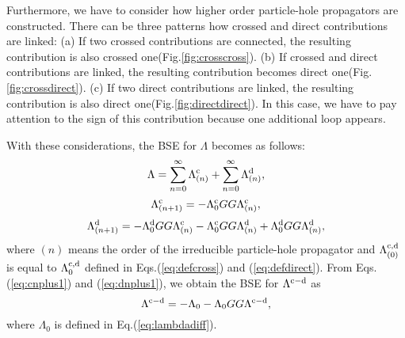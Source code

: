 %
Furthermore, we have to consider how higher order particle-hole propagators are constructed.
There can be three patterns how crossed and direct contributions are linked:
(a) If two crossed contributions are connected, the resulting contribution is also crossed one(Fig.\ref{fig:crosscross}).
(b) If crossed and direct contributions are linked, the resulting contribution becomes direct one(Fig.\ref{fig:crossdirect}).
(c) If two direct contributions are linked, the resulting contribution is also direct one(Fig.\ref{fig:directdirect}). 
In this case, we have to pay attention to the sign of this contribution because one additional loop appears.

With these considerations, the BSE for $\Lambda$ becomes as follows:
%
\begin{equation}
	\Lambda = \sum_{n=0}^{\infty}\Lambda^{\rm c}_{(n)} + \sum_{n=0}^{\infty}\Lambda^{\rm d}_{(n)},
	\label{eq:BSE}
\end{equation}
%
\begin{equation}
	\Lambda^{\rm c}_{(n+1)} = -\Lambda^{\rm c}_0GG\Lambda^{\rm c}_{(n)},
	\label{eq:cnplus1}
\end{equation}
%
\begin{equation}
	\Lambda^{\rm d}_{(n+1)} = -\Lambda^{\rm d}_0GG\Lambda^{\rm c}_{(n)}
	- \Lambda^{\rm c}_0GG\Lambda^{\rm d}_{(n)}
	+ \Lambda^{\rm d}_0GG\Lambda^{\rm d}_{(n)},
	\label{eq:dnplus1}
\end{equation}
%
where $(n)$ means the order of the irreducible particle-hole propagator
and $\Lambda^{\rm c, \rm d}_{(0)}$ is equal to $\Lambda^{\rm c, \rm d}_0$ defined in Eqs.(\ref{eq:defcross}) and (\ref{eq:defdirect}).
From Eqs.(\ref{eq:cnplus1}) and (\ref{eq:dnplus1}), we obtain the BSE for $\Lambda^{\rm c - \rm d}$ as
%
\begin{equation}
	\Lambda^{\rm c - \rm d}=  - \Lambda_0 - 
	\Lambda_0GG\Lambda^{\rm c - \rm d},
	\label{eq:BSELambda}
\end{equation}
%
where $\Lambda_0$ is defined in Eq.(\ref{eq:lambdadiff}).

